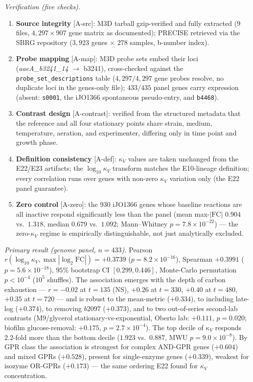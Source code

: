 \documentclass[11pt,a4paper]{article}
\theoremstyle{plain}
\theoremstyle{definition}
\theoremstyle{remark}
\begin{document}
\emph{Verification (five checks).}
\begin{enumerate}\itemsep0pt
\item \textbf{Source integrity} {[A-src]}: M3D tarball
  gzip-verified and fully extracted ($9$ files, $4{,}297 \times 907$
  gene matrix as documented); PRECISE retrieved via the SBRG
  repository ($3{,}923$ genes $\times$ $278$ samples, b-number
  index).
\item \textbf{Probe mapping} {[A-map]}: M3D probe sets embed their
  loci (\emph{aaeA\_b3241\_14} $\to$ b3241), cross-checked against
  the \texttt{probe\_set\_descriptions} table ($4{,}297/4{,}297$
  gene probes resolve, no duplicate loci in the genes-only file);
  $433/435$ panel genes carry expression (absent: \texttt{s0001},
  the iJO1366 spontaneous pseudo-entry, and \texttt{b4468}).
\item \textbf{Contrast design} {[A-contrast]}: verified from the
  structured metadata that the reference and all four stationary
  points share strain, medium, temperature, aeration, and
  experimenter, differing only in time point and growth phase.
\item \textbf{Definition consistency} {[A-def]}: $\kappa_V$ values
  are taken unchanged from the E22/E23 artifacts; the
  $\log_{10}\kappa_V$ transform matches the E10-lineage definition;
  every correlation runs over genes with non-zero $\kappa_V$
  variation only (the E22 panel guarantee).
\item \textbf{Zero control} {[A-zero]}: the $930$ iJO1366 genes
  whose baseline reactions are all inactive respond significantly
  less than the panel (mean max-$|\mathrm{FC}|$ $0.904$ vs.\
  $1.318$, median $0.679$ vs.\ $1.092$; Mann--Whitney
  $p = 7.8 \times 10^{-22}$) --- the zero-$\kappa_V$ regime is
  empirically distinguishable, not just analytically excluded.
\end{enumerate}

\emph{Primary result (genome panel, $n = 433$).} Pearson
$r(\log_{10}\kappa_V, \max|\log_2\mathrm{FC}|) = +0.3739$
($p = 8.2 \times 10^{-16}$), Spearman $+0.3991$
($p = 5.6 \times 10^{-18}$), $95\%$ bootstrap CI $[0.299, 0.446]$,
Monte-Carlo permutation $p < 10^{-4}$ ($10^5$ shuffles). The
association emerges with the depth of carbon exhaustion --- $r =
-0.02$ at $t=135$ (NS), $+0.26$ at $t=330$, $+0.40$ at $t=480$,
$+0.35$ at $t=720$ --- and is robust to the mean-metric
($+0.334$), to including late-log ($+0.374$), to removing $b2097$
($+0.373$), and to two out-of-series second-lab contrasts (M9/glycerol
stationary-vs-exponential, Oberto lab: $+0.111$, $p = 0.020$;
biofilm glucose-removal: $+0.175$, $p = 2.7 \times 10^{-4}$). The
top decile of $\kappa_V$ responds $2.2$-fold more than the bottom
decile ($1.923$ vs.\ $0.887$, MWU $p = 9.0 \times 10^{-8}$). By GPR
class the association is strongest for complex AND-GPR genes
($+0.604$) and mixed GPRs ($+0.528$), present for single-enzyme
genes ($+0.339$), weakest for isozyme OR-GPRs ($+0.173$) --- the
same ordering E22 found for $\kappa_V$ concentration.
\end{document}
